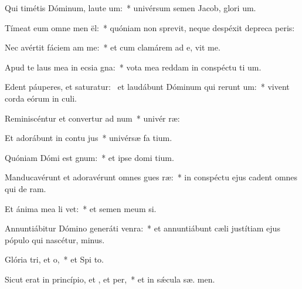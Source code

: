 \item Qui timétis Dóminum, laute um:~* univérsum semen Jacob, glori um.
\item Tímeat eum omne men ël:~* quóniam non sprevit, neque despéxit depreca peris:
\item Nec avértit fáciem am  me:~* et cum clamárem ad e, vit me.
\item Apud te laus mea in ecsia gna:~* vota mea reddam in conspéctu ti um.
\item Edent páuperes, et saturatur:~\pscross{} et laudábunt Dóminum qui rerunt um:~* vivent corda eórum in  culi.
\item Reminiscéntur et convertur ad num~* univér  ræ:
\item Et adorábunt in contu jus~* univérsæ fa tium.
\item Quóniam Dómi est gnum:~* et ipse domi tium.
\item Manducavérunt et adoravérunt omnes gues ræ:~* in conspéctu ejus cadent omnes qui de  ram.
\item Et ánima mea li vet:~* et semen meum  si.
\item Annuntiábitur Dómino generáti venra:~* et annuntiábunt cæli justítiam ejus pópulo qui nascétur,   minus.
\item Glória tri, et o,~* et Spi to.
\item Sicut erat in princípio, et , et per,~* et in sǽcula sæ. men.
